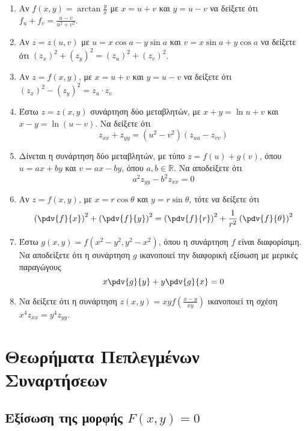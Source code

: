 \begin{enumerate}
  \item Αν $ f(x,y) = \arctan{\frac{y}{x}} $ με $ x=u+v $ και $ y = u-v $ 
    να δείξετε ότι $ f_{u} + f_{v} = \frac{u-v}{u^{2}+v^{2}} $.

  \item  Αν $ z=z(u,v) $ με $ u=x \cos{a} - y \sin{a} $ και $ v= x \sin{a} + y \cos{a} $
    να δείξετε ότι $ (z_{x})^{2} + (z_{y})^{2} = (z_{u})^{2} + (z_{v})^{2} $.

  \item Αν $ z=f(x,y) $, με $ x=u+v $ και $ y = u-v $ να δείξετε ότι 
    $ (z_{x})^{2} - (z_{y})^{2} = z_{u}\cdot z_{v} $ 

  \item Έστω $ z=z(x,y) $ συνάρτηση δύο μεταβλητών, με $ x+y= \ln{u+v} $ και 
    $ x-y = \ln{(u-v)} $. Να δείξετε ότι 
    \[
      z_{xx}+z_{yy} = (u^{2}-v^{2})(z_{uu}-z_{vv}) 
    \]
  \item Δίνεται η συνάρτηση δύο μεταβλητών, με τύπο
    $ z = f(u) + g(v) $, όπου $ u = ax + by $ και $ v = ax - by $, όπου 
    $ a,b \in \mathbb{R} $. Να αποδείξετε ότι 
    \[
      a^{2} z_{yy} - b^{2}z_{xx} = 0 
    \] 
  \item Αν $ z = f(x,y) $, με $ x=r \cos{\theta} $ και $ y = r \sin{\theta} $, 
    τότε να δείξετε ότι
    \[
      \left(\pdv{f}{x}\right)^{2} + \left(\pdv{f}{y}\right)^{2} = 
      \left(\pdv{f}{r}\right)^{2} + \frac{1}{ r^{2}} 
      \left(\pdv{f}{\theta}\right)^{2} 
    \] 
  \item Έστω $ g(x,y) = f(x^{2} - y^{2}, y^{2} - x^{2}) $, όπου η συνάρτηση 
    $f$ είναι διαφορίσιμη. Να αποδείξετε ότι η συνάρτηση $g$ ικανοποιεί 
    την διαφορική εξίσωση με μερικές παραγώγους
    \[
      x\pdv{g}{y} + y\pdv{g}{x} = 0
    \] 
  \item Να δείξετε ότι η συνάρτηση $ z(x,y) = xyf\left(\frac{ x-y }{ xy }\right) $
    ικανοποιεί τη σχέση $ x^{4} z_{xx} = y^{4} z_{yy} $.


\end{enumerate}

\section*{Θεωρήματα Πεπλεγμένων Συναρτήσεων}

\subsection*{Εξίσωση της μορφής \ensuremath{F(x,y)=0}}

